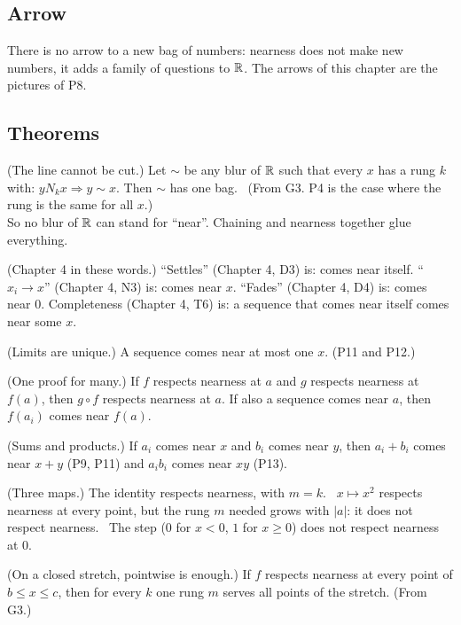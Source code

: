 \subsection*{Arrow}

\begin{lines}
\item[\lab{P14}] There is no arrow to a new bag of numbers: nearness does not make new numbers, it adds a family of questions to $\mathbb{R}$. The arrows of this chapter are the pictures of P8.
\end{lines}

\subsection*{Theorems}

\begin{lines}
\item[\lab{T1}] (The line cannot be cut.) Let $\sim$ be any blur of $\mathbb{R}$ such that every $x$ has a rung $k$ with: $y \mathrel{N_k} x \Rightarrow y \sim x$. Then $\sim$ has one bag. \ (From G3. P4 is the case where the rung is the same for all $x$.) \\
So no blur of $\mathbb{R}$ can stand for ``near''. Chaining and nearness together glue everything.
\item[\lab{T2}] (Chapter 4 in these words.) ``Settles'' (Chapter 4, D3) is: comes near itself. ``$x_i \to x$'' (Chapter 4, N3) is: comes near $x$. ``Fades'' (Chapter 4, D4) is: comes near $0$. Completeness (Chapter 4, T6) is: a sequence that comes near itself comes near some $x$.
\item[\lab{T3}] (Limits are unique.) A sequence comes near at most one $x$. (P11 and P12.)
\item[\lab{T4}] (One proof for many.) If $f$ respects nearness at $a$ and $g$ respects nearness at $f(a)$, then $g \circ f$ respects nearness at $a$. If also a sequence comes near $a$, then $f(a_i)$ comes near $f(a)$.
\item[\lab{T5}] (Sums and products.) If $a_i$ comes near $x$ and $b_i$ comes near $y$, then $a_i + b_i$ comes near $x + y$ (P9, P11) and $a_i b_i$ comes near $x y$ (P13).
\item[\lab{T6}] (Three maps.) The identity respects nearness, with $m = k$. \ $x \mapsto x^2$ respects nearness at every point, but the rung $m$ needed grows with $|a|$: it does not respect nearness. \ The step ($0$ for $x < 0$, $1$ for $x \ge 0$) does not respect nearness at $0$.
\item[\lab{T7}] (On a closed stretch, pointwise is enough.) If $f$ respects nearness at every point of $b \le x \le c$, then for every $k$ one rung $m$ serves all points of the stretch. (From G3.)

\end{lines}

